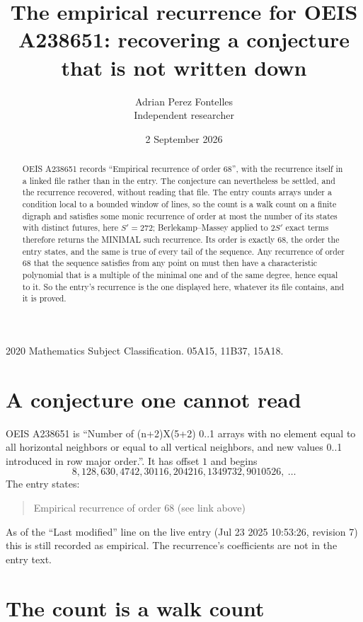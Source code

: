 \documentclass[11pt,a4paper]{article}
\title{The empirical recurrence for OEIS A238651: recovering a conjecture that is not written down}
\author{Adrian Perez Fontelles\\ \small Independent researcher}
\date{2 September 2026}
\theoremstyle{plain}
\theoremstyle{definition}
\begin{document}
\maketitle

\begin{abstract}
OEIS A238651 records ``Empirical recurrence of order $68$'', with the recurrence itself in a
linked file rather than in the entry. The conjecture can nevertheless be settled, and the
recurrence recovered, without reading that file. The entry counts arrays under a condition
local to a bounded window of lines, so the count is a walk count on a finite digraph and
satisfies some monic recurrence of order at most the number of its states with distinct
futures, here $S'=272$; Berlekamp--Massey applied to $2S'$ exact
terms therefore returns the MINIMAL such recurrence. Its order is exactly $68$, the order
the entry states, and the same is true of every tail of the sequence. Any recurrence of order
$68$ that the sequence satisfies from any point on must then have a characteristic
polynomial that is a multiple of the minimal one and of the same degree, hence equal to it. So
the entry's recurrence is the one displayed here, whatever its file contains, and it is
proved.
\end{abstract}

\noindent\small 2020 Mathematics Subject Classification. 05A15, 11B37, 15A18.\normalsize

\section{A conjecture one cannot read}

OEIS A238651 is ``Number of (n+2)X(5+2) 0..1 arrays with no element equal to all horizontal neighbors or equal to all vertical neighbors, and new values 0..1 introduced in row major order.''. It has offset $1$ and begins
\[
8, 128, 630, 4742, 30116, 204216, 1349732, 9010526,\ \dots
\]
The entry states:
\begin{quote}
Empirical recurrence of order 68 (see link above)
\end{quote}
As of the ``Last modified'' line on the live entry (Jul 23 2025 10:53:26, revision 7) this is still
recorded as empirical. The recurrence's coefficients are not in the entry text.

\section{The count is a walk count}
\end{document}
